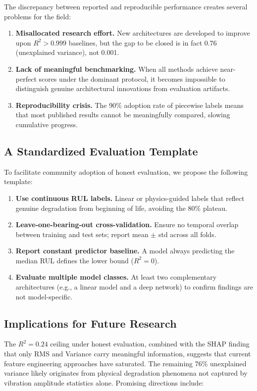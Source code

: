 \documentclass[5p,twocolumn]{elsarticle}
\begin{document}
The discrepancy between reported and reproducible performance creates several problems for the field:

\begin{enumerate}
    \item \textbf{Misallocated research effort.} New architectures are developed to improve upon $R^2 > 0.999$ baselines, but the gap to be closed is in fact 0.76 (unexplained variance), not 0.001.
    \item \textbf{Lack of meaningful benchmarking.} When all methods achieve near-perfect scores under the dominant protocol, it becomes impossible to distinguish genuine architectural innovations from evaluation artifacts.
    \item \textbf{Reproducibility crisis.} The 90\% adoption rate of piecewise labels means that most published results cannot be meaningfully compared, slowing cumulative progress.
\end{enumerate}

\subsection{A Standardized Evaluation Template}

To facilitate community adoption of honest evaluation, we propose the following template:

\begin{enumerate}
    \item \textbf{Use continuous RUL labels.} Linear or physics-guided labels that reflect genuine degradation from beginning of life, avoiding the 80\% plateau.
    \item \textbf{Leave-one-bearing-out cross-validation.} Ensure no temporal overlap between training and test sets; report mean $\pm$ std across all folds.
    \item \textbf{Report constant predictor baseline.} A model always predicting the median RUL defines the lower bound ($R^2 = 0$).
    \item \textbf{Evaluate multiple model classes.} At least two complementary architectures (e.g., a linear model and a deep network) to confirm findings are not model-specific.
\end{enumerate}

\subsection{Implications for Future Research}

The $R^2 = 0.24$ ceiling under honest evaluation, combined with the SHAP finding that only RMS and Variance carry meaningful information, suggests that current feature engineering approaches have saturated. The remaining 76\% unexplained variance likely originates from physical degradation phenomena not captured by vibration amplitude statistics alone. Promising directions include:
\end{document}
